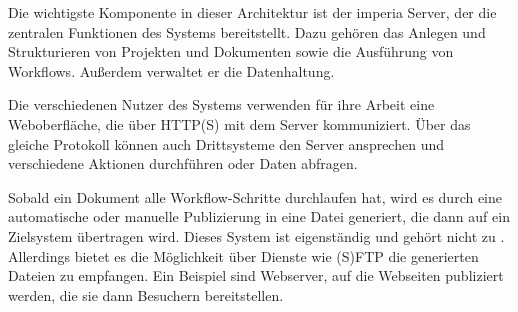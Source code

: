         Die wichtigste Komponente in dieser Architektur ist der imperia Server,
        der die zentralen Funktionen des Systems bereitstellt.
        Dazu gehören das Anlegen und Strukturieren von Projekten
        und Dokumenten sowie die Ausführung von Workflows.
        Außerdem verwaltet er die Datenhaltung.

        Die verschiedenen Nutzer des Systems
        verwenden für ihre Arbeit eine Weboberfläche,
        die über HTTP(S) mit dem Server kommuniziert.
        Über das gleiche Protokoll können auch Drittsysteme den Server
        ansprechen und verschiedene Aktionen durchführen oder Daten abfragen.

        Sobald ein Dokument alle Workflow-Schritte durchlaufen hat,
        wird es durch eine automatische oder manuelle Publizierung
        in eine Datei generiert, die dann auf ein Zielsystem übertragen wird.
        Dieses System ist eigenständig und gehört nicht zu {\imperia}.
        Allerdings bietet es die Möglichkeit über Dienste wie (S)FTP
        die generierten Dateien zu empfangen.
        Ein Beispiel sind Webserver, auf die Webseiten publiziert werden,
        die sie dann Besuchern bereitstellen.